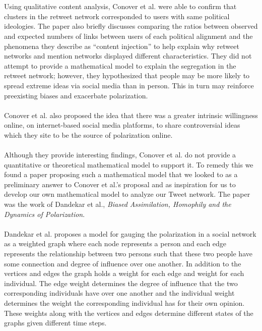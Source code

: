 \documentclass{article}
\begin{document}
\\\\
Using qualitative content analysis, Conover et al. were able to confirm that clusters in the
retweet network corresponded to users with same political ideologies. The paper also briefly discusses comparing the ratios between observed and expected numbers of links between
users of each political alignment and the phenomena they describe as “content injection” to help explain why retweet networks and mention networks displayed different characteristics. They did not attempt to provide a mathematical model to explain the segregation in the retweet network; however, they hypothesized that people may be more likely to spread extreme ideas via social media than in person. This in turn may reinforce preexisting biases and exacerbate polarization.
\\\\
Conover et al. also proposed the idea that there was a greater intrinsic willingness online, on internet-based social media platforms, to share controversial ideas which they site to be the source of polarization online. 
\\\\
Although they provide interesting findings, Conover et al. do not provide a quantitative or theoretical mathematical model to support it. To remedy this we found a paper proposing such a mathematical model that we looked to as a preliminary answer to Conover et al.'s proposal and as inspiration for us to develop our own mathematical model to analyze our Tweet network. The paper was the work of Dandekar et al.\cite{goel}, \textit{Biased Assimilation, Homophily and the Dynamics of Polarization}.
\\\\
Dandekar et al. proposes a model for gauging the polarization in a social network as a weighted graph where each node represents a person and each edge represents the relationship between two persons such that these two people have some connection and degree of influence over one another. In addition to the vertices and edges the graph holds a weight for each edge and weight for each individual. The edge weight determines the degree of influence that the two corresponding individuals have over one another and the individual weight determines the weight the corresponding individual has for their own opinion. These weights along with the vertices and edges determine different states of the graphs given different time steps.
\\\\
\end{document}
